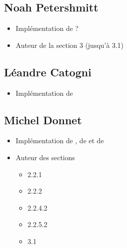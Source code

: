 \documentclass[
]{article}
\providecommand{\tightlist}{%
  \setlength{\itemsep}{0pt}\setlength{\parskip}{0pt}}
\begin{document}
\subsection{Noah Petershmitt}\label{noah-petershmitt}

\begin{itemize}
\tightlist
\item
  Implémentation de  ?
\item
  Auteur de la section 3 (jusqu'à 3.1)
\end{itemize}

\subsection{Léandre Catogni}\label{luxe9andre-catogni}

\begin{itemize}
\tightlist
\item
  Implémentation de 
\end{itemize}

\subsection{Michel Donnet}\label{michel-donnet}

\begin{itemize}
\tightlist
\item
  Implémentation de , de  et
  de 
\item
  Auteur des sections

  \begin{itemize}
  \tightlist
  \item
    2.2.1
  \item
    2.2.2
  \item
    2.2.4.2
  \item
    2.2.5.2
  \item
    3.1
  \end{itemize}
\end{itemize}

\newpage

\printbibliography[heading=bibintoc, title={Références}]
\end{document}
